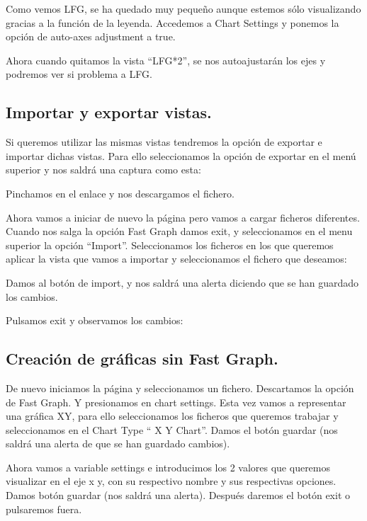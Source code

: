 Como vemos LFG, se ha quedado muy pequeño aunque estemos sólo visualizando gracias a la función de la leyenda. Accedemos a Chart Settings y ponemos la opción de auto-axes adjustment a true.

Ahora cuando quitamos la vista “LFG*2”, se nos autoajustarán los ejes y podremos ver si problema a LFG.

\subsection{Importar y exportar vistas.}
Si queremos utilizar las mismas vistas tendremos la opción de exportar e importar dichas vistas.
Para ello seleccionamos la opción de exportar en el menú superior y nos saldrá una captura como esta:

Pinchamos en el enlace y nos descargamos el fichero.

Ahora vamos a iniciar de nuevo la página pero vamos a cargar ficheros diferentes. Cuando nos salga la opción Fast Graph damos exit, y seleccionamos en el menu superior la opción “Import”. 
Seleccionamos los ficheros en los que queremos aplicar la vista que vamos a importar y seleccionamos el fichero que deseamos:

Damos al botón de import, y nos saldrá una alerta diciendo que se han guardado los cambios.

Pulsamos exit y observamos los cambios:

\subsection{Creación de gráficas sin Fast Graph.}
De nuevo iniciamos la página y seleccionamos un fichero.
Descartamos la opción de Fast Graph.
Y presionamos en chart settings.
Esta vez vamos a representar una gráfica XY, para ello seleccionamos los ficheros que queremos trabajar y seleccionamos en el Chart Type “ X Y Chart”.
Damos el botón guardar (nos saldrá una alerta de que se han guardado cambios).

Ahora vamos a variable settings e introducimos los 2 valores que queremos visualizar en el eje x y, con su respectivo nombre y sus respectivas opciones. Damos botón guardar (nos saldrá una alerta). Después daremos el botón exit o pulsaremos fuera.

